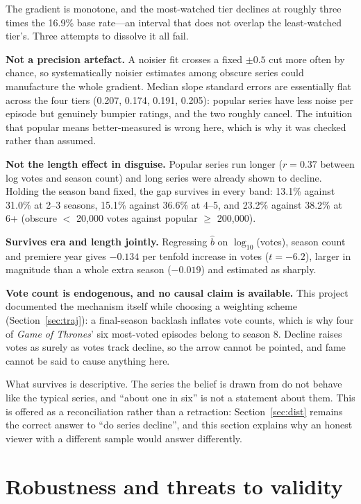 \documentclass[11pt,a4paper]{article}
\begin{document}
The gradient is monotone, and the most-watched tier declines at roughly three
times the 16.9\% base rate---an interval that does not overlap the least-watched
tier's. Three attempts to dissolve it all fail.

\textbf{Not a precision artefact.} A noisier fit crosses a fixed $\pm 0.5$ cut
more often by chance, so systematically noisier estimates among obscure series
could manufacture the whole gradient. Median slope standard errors are
essentially flat across the four tiers (0.207, 0.174, 0.191, 0.205): popular
series have less noise per episode but genuinely bumpier ratings, and the two
roughly cancel. The intuition that popular means better-measured is wrong here,
which is why it was checked rather than assumed.

\textbf{Not the length effect in disguise.} Popular series run longer ($r =
0.37$ between log votes and season count) and long series were already shown to
decline. Holding the season band fixed, the gap survives in every band: 13.1\%
against 31.0\% at 2--3 seasons, 15.1\% against 36.6\% at 4--5, and 23.2\%
against 38.2\% at 6+ (obscure $<$ 20,000 votes against popular $\ge$ 200,000).

\textbf{Survives era and length jointly.} Regressing $\hat{b}$ on
$\log_{10}$(votes), season count and premiere year gives $-0.134$ per tenfold
increase in votes ($t = -6.2$), larger in magnitude than a whole extra season
($-0.019$) and estimated as sharply.

\textbf{Vote count is endogenous, and no causal claim is available.} This
project documented the mechanism itself while choosing a weighting scheme
(Section~\ref{sec:traj}): a final-season backlash inflates vote counts, which is
why four of \emph{Game of Thrones}' six most-voted episodes belong to season 8.
Decline raises votes as surely as votes track decline, so the arrow cannot be
pointed, and fame cannot be said to cause anything here.

What survives is descriptive. The series the
belief is drawn from do not behave like the typical series, and ``about one
in six'' is not a statement about them. This is offered as a reconciliation
rather than a retraction: Section~\ref{sec:dist} remains the correct answer to
``do series decline'', and this section explains why an honest viewer with a
different sample would answer differently.

\FloatBarrier
\section{Robustness and threats to validity}
\label{sec:robust}
\end{document}

